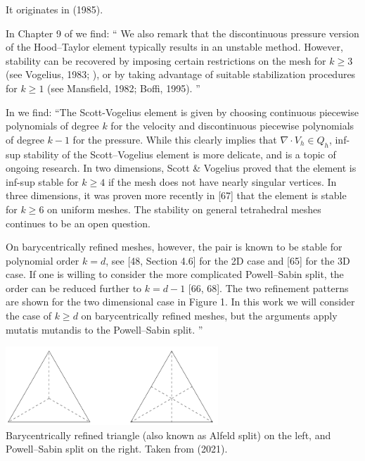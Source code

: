 
It originates in  (1985). 

 
In Chapter 9 of \textcite{bobf13} we find: 
``
We also remark that the discontinuous
pressure version of the Hood–Taylor element typically
results in an unstable method. However, stability can be
recovered by imposing certain restrictions on the mesh for
$k \ge 3$ (see Vogelius, 1983; \cite{scvo85}), or
by taking advantage of suitable stabilization procedures for
$k\ge 1$ (see Mansfield, 1982; Boffi, 1995).
''

In \textcite{fams21} we find:
``The Scott-Vogelius element is given by choosing continuous piecewise polynomials of degree $k$ for
the velocity and discontinuous piecewise polynomials of degree $k-1$ for the pressure. While this clearly
implies that $\nabla\cdot V_h \in Q_h$, inf-sup stability of the Scott–Vogelius element 
is more delicate, and is a topic of ongoing research. 
In two dimensions, Scott \& Vogelius proved \cite{scvo85} that the element is inf-sup
stable for $k\ge 4$ if the mesh does not have nearly singular vertices. 
In three dimensions, it was proven more recently in [67] that the element is stable 
for $k\ge 6$ on uniform meshes. The stability on general
tetrahedral meshes continues to be an open question.

On barycentrically refined meshes, however, the pair is known to be stable for polynomial order
$k = d$, see [48, Section 4.6] for the 2D case and [65] for the 3D case. If one is willing to 
consider the more complicated Powell–Sabin split, the order can be reduced further to 
$k = d-1$ [66, 68]. The two
refinement patterns are shown for the two dimensional case in Figure 1. In this work we will consider
the case of $k \ge d$ on barycentrically refined meshes, but the arguments apply mutatis mutandis to the
Powell–Sabin split.
''

\begin{center}
\includegraphics[width=8cm]{images/pair_scott_vogelius/scottvogelius_split}\\
{\captionfont 
Barycentrically refined triangle (also known as Alfeld split) on the left,
and Powell–Sabin split on the right. Taken from \textcite{fams21} (2021).}
\end{center}

